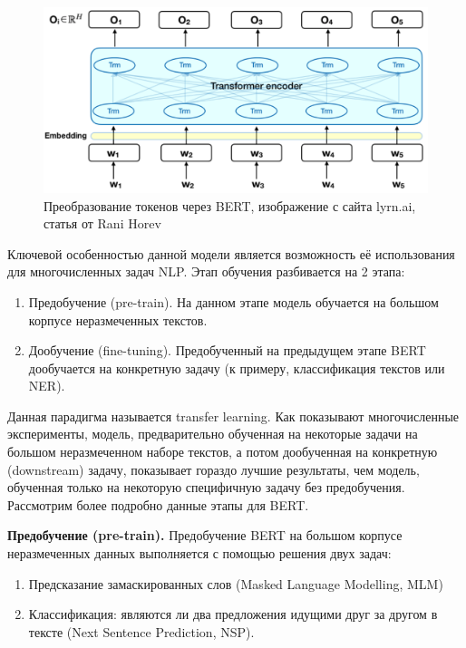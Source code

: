 \documentclass[12pt,a4paper]{article}
\begin{document}
\begin{figure}[H]
	\begin{center}
		\includegraphics[scale=0.3]{trans2.png}
	\end{center}
	\caption{Преобразование токенов через BERT, изображение с сайта lyrn.ai, статья от Rani Horev}
\end{figure}

Ключевой особенностью данной модели является возможность её использования для многочисленных задач NLP. Этап обучения разбивается на 2 этапа:
\begin{enumerate}
    \item Предобучение (pre-train). На данном этапе модель обучается на большом корпусе неразмеченных текстов.
    \item Дообучение (fine-tuning). Предобученный на предыдущем этапе BERT дообучается на конкретную задачу (к примеру, классификация текстов или NER).
\end{enumerate}

\noindent Данная парадигма называется transfer learning. Как показывают многочисленные эксперименты, модель, предварительно обученная на некоторые задачи на большом неразмеченном наборе текстов, а потом дообученная на конкретную (downstream) задачу, показывает гораздо лучшие результаты, чем модель, обученная только на некоторую специфичную задачу без предобучения. Рассмотрим более подробно данные этапы для BERT.

\textbf{Предобучение (pre-train).} Предобучение BERT на большом корпусе неразмеченных данных выполняется с помощью решения двух задач:
\begin{enumerate}
    \item Предсказание замаскированных слов (Masked Language Modelling, MLM)
    \item Классификация: являются ли два предложения идущими друг за другом в тексте (Next Sentence Prediction, NSP).
\end{enumerate}
\end{document}
